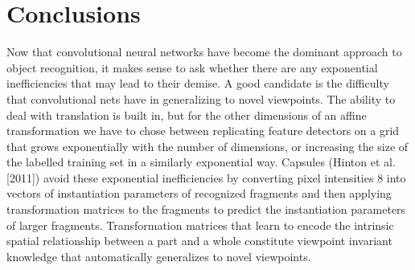 \chapter{Conclusions}

\label{Conclusions}

Now that convolutional neural networks have become the dominant approach to object recognition, it
makes sense to ask whether there are any exponential inefficiencies that may lead to their demise. A
good candidate is the difficulty that convolutional nets have in generalizing to novel viewpoints. The
ability to deal with translation is built in, but for the other dimensions of an affine transformation
we have to chose between replicating feature detectors on a grid that grows exponentially with the
number of dimensions, or increasing the size of the labelled training set in a similarly exponential way.
Capsules (Hinton et al. [2011]) avoid these exponential inefficiencies by converting pixel intensities
8
into vectors of instantiation parameters of recognized fragments and then applying transformation
matrices to the fragments to predict the instantiation parameters of larger fragments. Transformation
matrices that learn to encode the intrinsic spatial relationship between a part and a whole constitute
viewpoint invariant knowledge that automatically generalizes to novel viewpoints. 